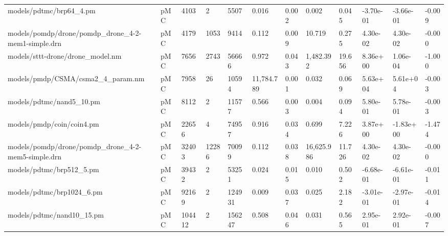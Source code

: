 \begin{tabular}{llllllllllll}
                           models/pdtmc/brp64\_4.pm &  pMC &   4103 &          2 &        5507 &          0.016 &            0.002 &                        0.002 &          0.045 &        -3.70e-01 &       -3.66e-01 &       -0.009 \\
models/pomdp/drone/pomdp\_drone\_4-2-mem1-simple.drn &  pMC &   4179 &       1053 &        9414 &          0.112 &            0.009 &                       10.719 &          0.275 &         4.30e-02 &        4.30e-02 &       -0.000 \\
                  models/sttt-drone/drone\_model.nm &  pMC &   7656 &       2743 &       56666 &          0.972 &            0.043 &                    1,482.392 &         19.656 &         8.36e+00 &        1.06e-04 &       -1.000 \\
                 models/pmdp/CSMA/csma2\_4\_param.nm &  pMC &   7958 &         26 &       10594 &     11,784.789 &            0.001 &                        0.032 &          0.069 &         5.63e+04 &        5.61e+04 &       -0.003 \\
                          models/pdtmc/nand5\_10.pm &  pMC &   8112 &          2 &       11577 &          0.566 &            0.003 &                        0.004 &          0.094 &         5.80e-01 &        5.78e-01 &       -0.003 \\
                         models/pmdp/coin/coin4.pm &  pMC &  22656 &          4 &       74957 &          0.916 &            0.034 &                        0.699 &          7.226 &         3.87e+00 &       -1.83e+00 &       -1.474 \\
models/pomdp/drone/pomdp\_drone\_4-2-mem5-simple.drn &  pMC &  32403 &      12286 &       70099 &          0.112 &            0.038 &                   16,625.986 &         11.726 &         4.30e-02 &        4.30e-02 &       -0.000 \\
                          models/pdtmc/brp512\_5.pm &  pMC &  39432 &          2 &       53251 &          0.024 &            0.015 &                        0.010 &          0.502 &        -6.68e-01 &       -6.61e-01 &       -0.011 \\
                         models/pdtmc/brp1024\_6.pm &  pMC &  92169 &          2 &      124931 &          0.009 &            0.037 &                        0.025 &          2.182 &        -3.01e-01 &       -2.97e-01 &       -0.014 \\
                         models/pdtmc/nand10\_15.pm &  pMC & 104412 &          2 &      156247 &          0.508 &            0.046 &                        0.031 &          0.565 &         2.95e-01 &        2.92e-01 &       -0.007 \\

\end{tabular}

